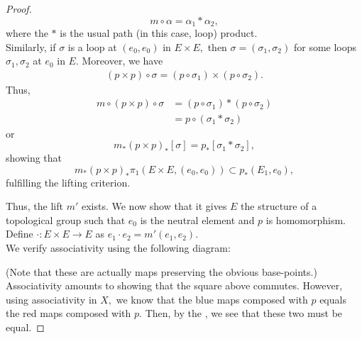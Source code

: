 \documentclass[12pt]{article}
\theoremstyle{definition}
\numberwithin{thm}{section}
\newcommand{\id}{\operatorname{id}}
\begin{document}
\begin{proof}
\begin{equation*}
		m\circ\alpha = \alpha_1*\alpha_2,
	\end{equation*}
	where the $*$ is the usual path (in this case, loop) product.\\
	Similarly, if $\sigma$ is a loop at $(e_0, e_0)$ in $E \times E,$ then $\sigma = (\sigma_1, \sigma_2)$ for some loops $\sigma_1, \sigma_2$ at $e_0$ in $E.$ Moreover, we have
	\begin{align*} 
		(p\times p)\circ\sigma = (p \circ \sigma_1)\times(p \circ \sigma_2).
	\end{align*}
	Thus,
	\begin{align*} 
		m\circ(p \times p) \circ \sigma &= (p \circ \sigma_1)*(p \circ \sigma_2)\\
		&= p \circ (\sigma_1 * \sigma_2)
	\end{align*}
	or
	\begin{equation*} 
		m_*(p\times p)_*[\sigma] = p_*[\sigma_1 * \sigma_2],	
	\end{equation*}
	showing that
	\begin{equation*} 
		m_*(p \times p)_*\pi_1(E\times E, (e_0, e_0)) \subset p_*(E_1, e_0),
	\end{equation*}
	fulfilling the lifting criterion.

	Thus, the lift $m'$ exists. We now show that it gives $E$ the structure of a topological group such that $e_0$ is the neutral element and $p$ is homomorphism.\\
	Define $\cdot:E\times E \to E$ as $e_1\cdot e_2 = m'(e_1, e_2).$\\
	We verify associativity using the following diagram:

	\begin{center}
	\end{center}

	(Note that these are actually maps preserving the obvious base-points.)\\
	Associativity amounts to showing that the square above commutes. However, using associativity in $X,$ we know that the blue maps composed with $p$ equals the red maps composed with $p.$ Then, by the , we see that these two must be equal.


\end{proof}
\end{document}
